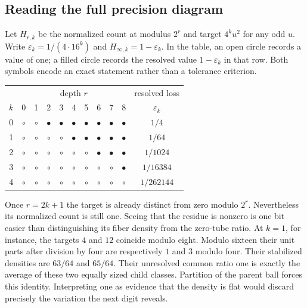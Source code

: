 \documentclass[12pt,letterpaper]{article}
\begin{document}
\subsection{Reading the full precision diagram}
Let $H_{r,k}$ be the normalized count at modulus $2^r$ and target $4^k u^2$ for any odd $u$. Write $\varepsilon_k=1/(4\cdot16^k)$ and $H_{\infty,k}=1-\varepsilon_k$. In the table, an open circle records a value of one; a filled circle records the resolved value $1-\varepsilon_k$ in that row. Both symbols encode an exact statement rather than a tolerance criterion.
\begin{center}\small
\begin{tabular}{c|ccccccccc|c}\toprule
 &\multicolumn{9}{c|}{depth $r$} & resolved loss\\
$k$ &0&1&2&3&4&5&6&7&8& $\varepsilon_k$\\\midrule
0&$\circ$&$\circ$&$\bullet$&$\bullet$&$\bullet$&$\bullet$&$\bullet$&$\bullet$&$\bullet$&$1/4$\\
1&$\circ$&$\circ$&$\circ$&$\circ$&$\bullet$&$\bullet$&$\bullet$&$\bullet$&$\bullet$&$1/64$\\
2&$\circ$&$\circ$&$\circ$&$\circ$&$\circ$&$\circ$&$\bullet$&$\bullet$&$\bullet$&$1/1024$\\
3&$\circ$&$\circ$&$\circ$&$\circ$&$\circ$&$\circ$&$\circ$&$\circ$&$\bullet$&$1/16384$\\
4&$\circ$&$\circ$&$\circ$&$\circ$&$\circ$&$\circ$&$\circ$&$\circ$&$\circ$&$1/262144$\\
\bottomrule\end{tabular}
\end{center}
Once $r=2k+1$ the target is already distinct from zero modulo $2^r$. Nevertheless its normalized count is still one. Seeing that the residue is nonzero is one bit easier than distinguishing its fiber density from the zero-tube ratio. At $k=1$, for instance, the targets $4$ and $12$ coincide modulo eight. Modulo sixteen their unit parts after division by four are respectively $1$ and $3$ modulo four. Their stabilized densities are $63/64$ and $65/64$. Their unresolved common ratio one is exactly the average of these two equally sized child classes. Partition of the parent ball forces this identity. Interpreting one as evidence that the density is flat would discard precisely the variation the next digit reveals.
\end{document}
